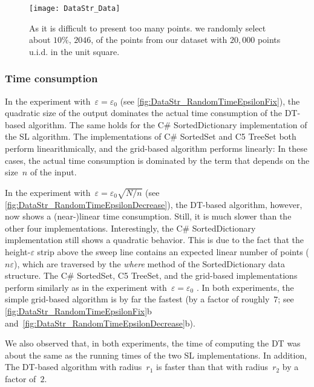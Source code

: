\begin{figure}[tb]
\centering
\texttt{[image: DataStr\_Data]}
\caption{As it is difficult to present too many points.
	we randomly select about $10\%$, $2046$,
	of the points from our dataset 
	with $20{,}000$ points
	u.i.d. in the unit square.
}
\label{fig:DataStr_RandomData}
\end{figure}

\subsubsection{Time consumption}
In the experiment with~$\varepsilon =\varepsilon_{0}$ 
(see \fig\ref{fig:DataStr_RandomTimeEpsilonFix}), 
the quadratic size of the output dominates the 
actual time consumption of the DT-based algorithm.
The same holds for the C\# SortedDictionary 
implementation of the SL algorithm. 
The implementations of C\# SortedSet and C5 TreeSet  
both perform linearithmically, 
and the grid-based algorithm performs linearly: 
In these cases, the actual time consumption is 
dominated by the term 
that depends on the size~$n$ of the input.


In the experiment with~$\varepsilon =\varepsilon_{0}\sqrt{N/n}$ 
(see \fig\ref{fig:DataStr_RandomTimeEpsilonDecrease}), 
the DT-based algorithm, however, now shows 
a (near-)linear time consumption. 
Still, it is much slower than the other four implementations. 
Interestingly, the C\# SortedDictionary 
implementation still shows a quadratic behavior. 
This is due to the fact 
that the height-$\varepsilon $ strip above the sweep line 
contains an expected linear number of points ($n\varepsilon$), 
which are traversed by the \emph{where} method 
of the SortedDictionary data structure. 
The C\# SortedSet, C5 TreeSet, and the grid-based 
implementations 
perform similarly as in the experiment 
with~$\varepsilon =\varepsilon_{0}$
. In both experiments, the simple grid-based algorithm is by 
far the fastest
(by a factor of roughly~$7$; 
see \figs\ref{fig:DataStr_RandomTimeEpsilonFix}b
and~\ref{fig:DataStr_RandomTimeEpsilonDecrease}b).




We also observed that, in both experiments, 
the time of computing the DT was about 
the same as the running times of 
the two SL implementations. 
In addition, The DT-based 
algorithm with radius~$r_{1}$ is faster than 
that with radius~$r_{2}$ by a factor of~$2$.



